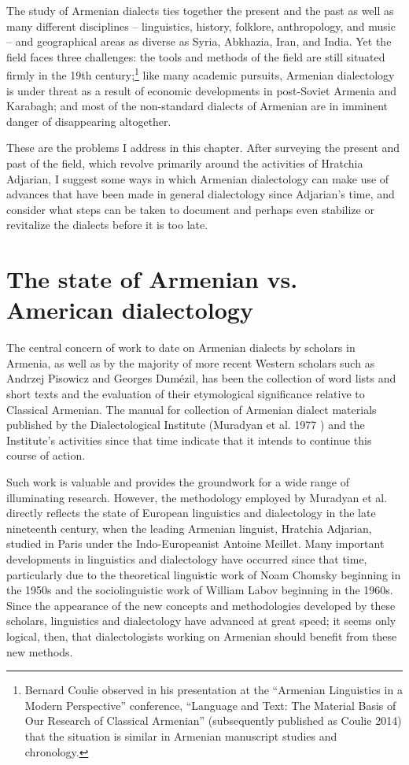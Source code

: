   
The study of Armenian dialects ties together the present and the past as well as many different disciplines -- linguistics, history, folklore, anthropology, and music -- and geographical areas as diverse as Syria, Abkhazia, Iran, and India. Yet the field faces three challenges: the tools and methods of the field are still situated firmly in the 19th century;\footnote{Bernard Coulie observed in his presentation at the ``Armenian Linguistics in a Modern Perspective'' conference, ``Language and Text: The Material Basis of Our Research of Classical Armenian'' (subsequently published as Coulie 2014) that the situation is similar in Armenian manuscript studies and chronology. } like many academic pursuits, Armenian dialectology is under threat as a result of economic developments in post-Soviet Armenia and Karabagh; and most of the non-standard dialects of Armenian are in imminent danger of disappearing altogether. 


These are the problems I address in this chapter. After surveying the present and past of the field, which revolve primarily around the activities of Hratchia Adjarian, I suggest some ways in which Armenian dialectology can make use of advances that have been made in general dialectology since Adjarian’s time, and consider what steps can be taken to document and perhaps even stabilize or revitalize the dialects before it is too late.




\section{The state of Armenian vs. American dialectology}


The central concern of work to date on Armenian dialects by scholars in Armenia, as well as by the majority of more recent Western scholars such as Andrzej Pisowicz and Georges Dumézil, has been the collection of word lists and short texts and the evaluation of their etymological significance relative to Classical Armenian. The manual for collection of Armenian dialect materials published by the Dialectological Institute (Muradyan et al. 1977 ) and the Institute’s activities since that time indicate that it intends to continue this course of action. 	

Such work is valuable and provides the groundwork for a wide range of illuminating research. However, the methodology employed by Muradyan et al. directly reflects the state of European linguistics and dialectology in the late nineteenth century, when the leading Armenian linguist, Hratchia Adjarian, studied in Paris under the Indo-Europeanist Antoine Meillet. Many important developments in linguistics and dialectology have occurred since that time, particularly due to the theoretical linguistic work of Noam Chomsky beginning in the 1950s and the sociolinguistic work of William Labov beginning in the 1960s. Since the appearance of the new concepts and methodologies developed by these scholars, linguistics and dialectology have advanced at great speed; it seems only logical, then, that dialectologists working on Armenian should benefit from these new methods. 	

